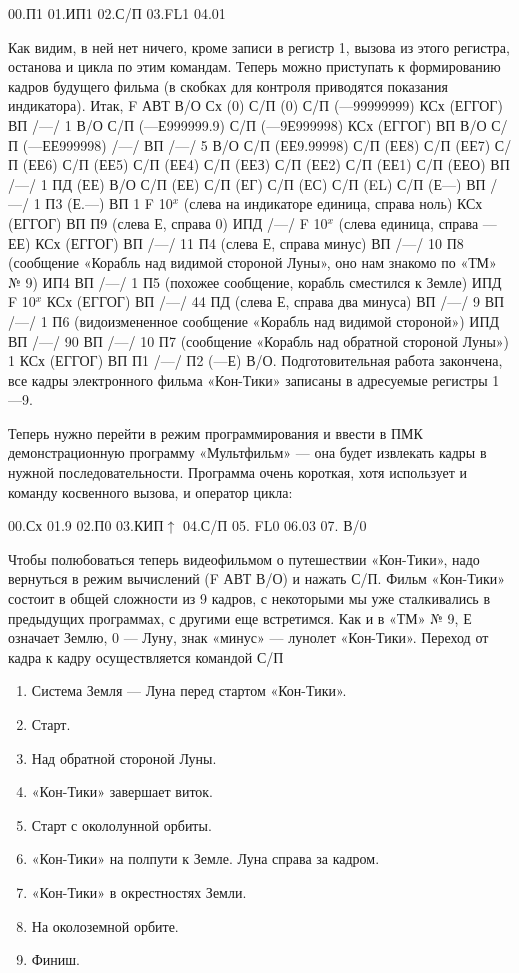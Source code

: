 \documentclass[11pt,a4paper,oneside]{article}
\begin{document}
00.П1 01.ИП1 02.С/П 03.FL1 04.01

Как видим, в ней нет ничего, кроме записи в регистр 1, вызова из этого регистра, останова и цикла по этим командам. Теперь можно приступать к формированию кадров будущего фильма (в скобках для контроля приводятся показания индикатора). Итак, F АВТ В/О Сх (0) С/П (0) С/П (—99999999) КСх (ЕГГОГ) ВП /—/ 1 В/О С/П (—Е999999.9) С/П (—9Е999998) КСх (ЕГГОГ) ВП В/О С/П (—ЕЕ999998) /—/ ВП /—/ 5 В/О С/П (ЕЕ9.99998) С/П (ЕЕ8) С/П (ЕЕ7) С/П (ЕЕ6) С/П (ЕЕ5) С/П (ЕЕ4) С/П (ЕЕЗ) С/П (ЕЕ2) С/П (ЕЕ1) С/П (ЕЕО) ВП /—/ 1 ПД (ЕЕ) В/О С/П (ЕЕ) С/П (ЕГ) С/П (ЕС) С/П (EL) С/П (Е—) ВП /—/ 1 П3 (Е.—) ВП 1 F 10$^{x}$ (слева на индикаторе единица, справа ноль) КСх (ЕГГОГ) ВП П9 (слева Е, справа 0) ИПД /—/ F 10$^{x}$ (слева единица, справа — ЕЕ) КСх (ЕГГОГ) ВП /—/ 11 П4 (слева Е, справа минус) ВП /—/ 10 П8 (сообщение «Корабль над видимой стороной Луны», оно нам знакомо по «ТМ» № 9) ИП4 ВП /—/ 1 П5 (похожее сообщение, корабль сместился к Земле) ИПД F 10$^{x}$ КСх (ЕГГОГ) ВП /—/ 44 ПД (слева Е, справа два минуса) ВП /—/ 9 ВП /—/ 1 П6 (видоизмененное сообщение «Корабль над видимой стороной») ИПД ВП /—/ 90 ВП /—/ 10 П7 (сообщение «Корабль над обратной стороной Луны») 1 КСх (ЕГГОГ) ВП П1 /—/ П2 (—Е) В/О. Подготовительная работа закончена, все кадры электронного фильма «Кон-Тики» записаны в адресуемые регистры 1—9.

Теперь нужно перейти в режим программирования и ввести в ПМК демонстрационную программу «Мультфильм» — она будет извлекать кадры в нужной последовательности. Программа очень короткая, хотя использует и команду косвенного вызова, и оператор цикла:

00.Сх 01.9 02.П0 03.КИП$\uparrow$ 04.С/П 05. FL0 06.03 07. В/0

Чтобы полюбоваться теперь видеофильмом о путешествии «Кон-Тики», надо вернуться в режим вычислений (F АВТ В/О) и нажать С/П. Фильм «Кон-Тики» состоит в общей сложности из 9 кадров, с некоторыми мы уже сталкивались в предыдущих программах, с другими еще встретимся. Как и в «ТМ» № 9, Е означает Землю, 0 — Луну, знак «минус» — лунолет «Кон-Тики». Переход от кадра к кадру осуществляется командой С/П

\begin{enumerate}
\item Система Земля — Луна перед стартом «Кон-Тики».
\item Старт.
\item Над обратной стороной Луны.
\item «Кон-Тики» завершает виток.
\item Старт с окололунной орбиты.
\item «Кон-Тики» на полпути к Земле. Луна справа за кадром.
\item «Кон-Тики» в окрестностях Земли.
\item На околоземной орбите.
\item Финиш.
\end{enumerate}
\end{document}
